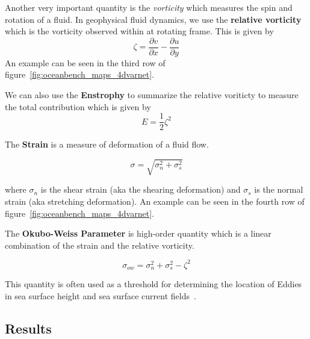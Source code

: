 Another very important quantity is the \textit{vorticity} which measures the spin and rotation of a fluid. In geophysical fluid dynamics, we use the \textbf{relative vorticity} which is the vorticity observed within at rotating frame.
This is given by
\begin{equation} \label{eq:relvorticity}
    \zeta = \frac{\partial v}{\partial x} - \frac{\partial u}{\partial y}
\end{equation}
An example can be seen in the third row of figure~\ref{fig:oceanbench_maps_4dvarnet}.



We can also use the \textbf{Enstrophy} to summarize the relative voriticty to measure the total contribution which is given by
\begin{equation} \label{eq:enstrophy}
    E = \frac{1}{2}\zeta^2
\end{equation}

The \textbf{Strain} is a measure of deformation of a fluid flow.

\begin{equation} \label{eq:strain}
    \sigma = \sqrt{\sigma_n^2 + \sigma_s^2}
\end{equation}

where $\sigma_n$ is the shear strain (aka the shearing deformation) and $\sigma_s$ is the normal strain (aka stretching deformation). An example can be seen in the fourth row of figure~\ref{fig:oceanbench_maps_4dvarnet}.

The \textbf{Okubo-Weiss Parameter} is high-order quantity which is a linear combination of the strain and the relative vorticity.

\begin{equation} \label{eq:okuboweiss}
    \sigma_{ow} = \sigma_n^2 + \sigma_s^2 - \zeta^2
\end{equation}

This quantity is often used as a threshold for determining the location of Eddies in sea surface height and sea surface current fields~\cite{OKUBO, WEISS, OKUBOWEISS}.
\subsection*{Results}

